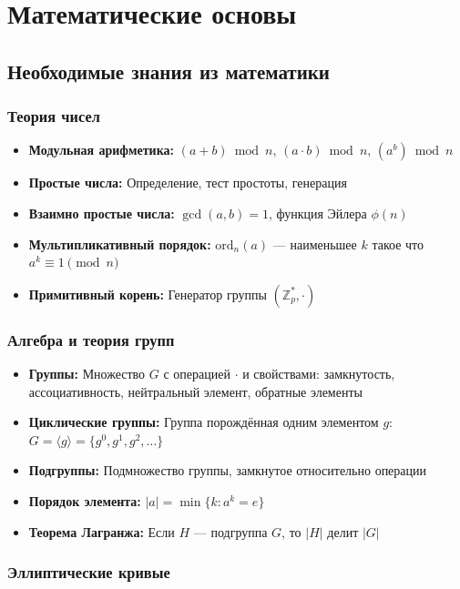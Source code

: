 \documentclass[11pt,a4paper,oneside]{book}
\begin{document}
\vspace{-0.5cm}\chapter{Математические основы}
\vspace{-0.3cm}\section{Необходимые знания из математики}
\vspace{-0.2cm}\subsection{Теория чисел}
\begin{itemize}
  \item \textbf{Модульная арифметика:} $(a + b) \bmod n$, $(a \cdot b) \bmod n$, $(a^b) \bmod n$
  \item \textbf{Простые числа:} Определение, тест простоты, генерация
  \item \textbf{Взаимно простые числа:} $\gcd(a, b) = 1$, функция Эйлера $\phi(n)$
  \item \textbf{Мультипликативный порядок:} $\text{ord}_n(a)$ — наименьшее $k$ такое что $a^k \equiv 1 \pmod{n}$
  \item \textbf{Примитивный корень:} Генератор группы $(\mathbb{Z}_p^*, \cdot)$
\end{itemize}
\vspace{-0.2cm}\subsection{Алгебра и теория групп}
\begin{itemize}
  \item \textbf{Группы:} Множество $G$ с операцией $\cdot$ и свойствами: замкнутость, ассоциативность, нейтральный элемент, обратные элементы
  \item \textbf{Циклические группы:} Группа порождённая одним элементом $g$: $G = \langle g \rangle = \{g^0, g^1, g^2, \ldots\}$
  \item \textbf{Подгруппы:} Подмножество группы, замкнутое относительно операции
  \item \textbf{Порядок элемента:} $|a| = \min\{k : a^k = e\}$
  \item \textbf{Теорема Лагранжа:} Если $H$ — подгруппа $G$, то $|H|$ делит $|G|$
\end{itemize}
\vspace{-0.2cm}\subsection{Эллиптические кривые}
\end{document}
